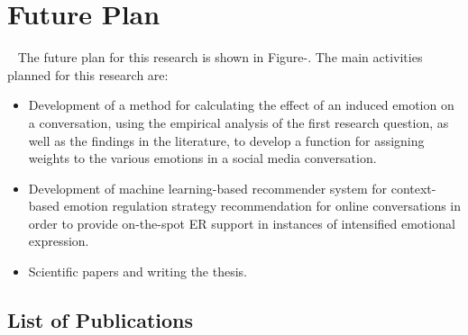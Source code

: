 \section{Future Plan}~\label{sec:discussion}
The future plan for this research is shown in Figure-. The main activities planned for this research are:
\begin{itemize}
    \item Development of a method for calculating the effect of an induced emotion on a conversation, using the empirical analysis of the first research question, as well as the findings in the literature, to develop a function for assigning weights to the various emotions in a social media conversation.
    \item Development of machine learning-based recommender system for context-based emotion regulation strategy recommendation for online conversations in order to provide on-the-spot ER support in instances of intensified emotional expression.
    \item Scientific papers and writing the thesis.
\end{itemize}
\subsection{List of Publications}


